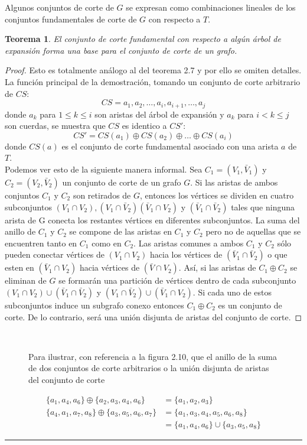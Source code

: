 \documentclass[10pt,a5paper]{book}
\newtheorem{teorema}{Teorema}[chapter]
\begin{document}
Algunos conjuntos de corte de $G$ se expresan como combinaciones lineales de los conjuntos fundamentales de corte de $G$ con respecto a $T$.

\begin{teorema}
El conjunto de corte fundamental con respecto a algún árbol de expansión forma una base para el conjunto de corte de un grafo.
\end{teorema}

\begin{proof}
Esto es totalmente análogo al del teorema 2.7 y por ello se omiten detalles. La función principal de la demostración, tomando un conjunto de corte arbitrario de $CS$:
\[ CS = a_1, a_2, \ldots, a_i, a_{i+1}, \ldots, a_j\]
donde $a_k$ para $1 \le k \le i$ son aristas del árbol de expansión y $a_k$ para $i < k \le j$ son cuerdas, se muestra que $CS$ es identico a $CS'$:
\[ CS' = CS(a_1) \oplus CS(a_2) \oplus \ldots \oplus CS(a_i) \]
donde $CS(a)$ es el conjunto de corte fundamental asociado con una arista $a$ de $T$.\\

Podemos ver esto de la siguiente manera informal. Sea $C_1 = (V_1,\bar{V}_1)$ y $C_2 = (V_2,\bar{V}_2)$ un conjunto de corte de un grafo $G$. Si las aristas de ambos conjuntos $C_1$ y $C_2$ son retirados de $G$, entonces los vértices se dividen en cuatro subconjuntos $(V_1 \cap V_2), (V_1 \cap \bar{V}_2) (\bar{V}_1 \cap V_2)$ y $(\bar{V}_1 \cap \bar{V}_2)$ tales que ninguna arista de G conecta los restantes vértices en diferentes subconjuntos. La suma del anillo de $C_1$ y $C_2$ se compone de las aristas en $C_1$ y $C_2$ pero no de aquellas que se encuentren tanto en $C_1$ como en $C_2$. Las aristas comunes a ambos $C_1$ y $C_2$ sólo pueden conectar vértices de $(V_1 \cap V_2)$ hacia los vértices de $(\bar{V}_1 \cap \bar{V}_2)$ o que esten en $(\bar{V}_1 \cap V_2)$ hacia vértices de $(\bar{V} \cap V_2)$. Así, si las aristas de $C_1 \oplus C_2$ se eliminan de $G$ se formarán una partición de vértices dentro de cada subconjunto $(V_1 \cap V_2) \cup (\bar{V}_1 \cap \bar{V}_2)$ y $(V_1 \cap \bar{V}_2) \cup (\bar{V}_1 \cap V_2)$. Si cada uno de estos subconjuntos induce un subgrafo conexo entonces $C_1 \oplus C_2$ es un conjunto de corte. De lo contrario, será una unión disjunta de aristas del conjunto de corte.
\end{proof}

\begin{figure}[H]
\caption{Para ilustrar, con referencia a la figura 2.10, que el anillo de la suma de dos conjuntos de corte arbitrarios o la unión disjunta de aristas del conjunto de corte}
\hrulefill{}\\
\end{figure}
\parbox{10cm}{
\begin{align}
\{a_1, a_4, a_6\} \oplus \{a_2, a_3, a_4, a_6\} & = \{a_1, a_2, a_3\} \nonumber\\
\{a_4, a_1, a_7, a_8\} \oplus \{a_3, a_5, a_6, a_7\} & = \{a_1, a_3, a_4, a_5, a_6, a_8\} \nonumber\\
& = \{a_1, a_4, a_6\} \cup \{a_3, a_5, a_8\} \nonumber
\end{align}}\hrule
\hfill
\end{document}
